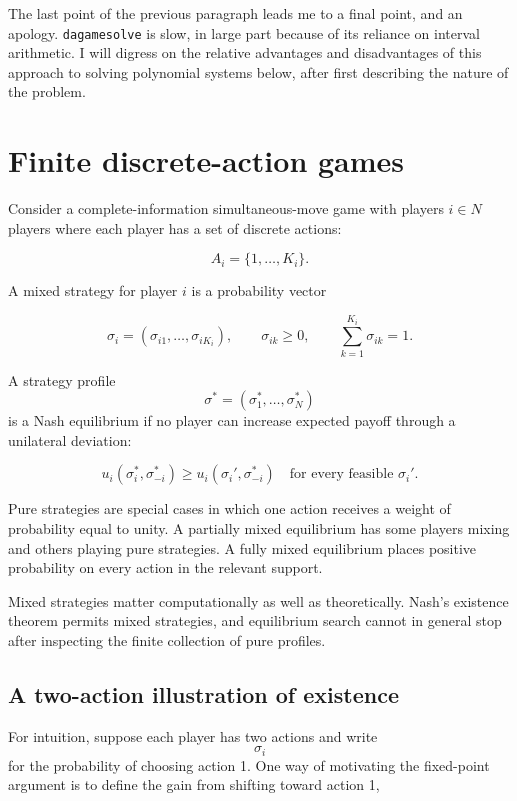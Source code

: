 \documentclass[11pt]{article}
\begin{document}
The last point of the previous paragraph leads me to a final point, and
an apology. \texttt{dagamesolve} is slow, in large part because of its
reliance on interval arithmetic. I will digress on the relative
advantages and disadvantages of this approach to solving polynomial
systems below, after first describing the nature of the problem.

    \section{Finite discrete-action
games}\label{finite-discrete-action-games}

Consider a complete-information simultaneous-move game with players
\(i \in N\) players where each player has a set of discrete actions:

\[
A_i=\{1,\ldots,K_i\}.
\]

A mixed strategy for player \(i\) is a probability vector

\[
\sigma_i=(\sigma_{i1},\ldots,\sigma_{iK_i}),
\qquad
\sigma_{ik}\geq 0,
\qquad
\sum_{k=1}^{K_i}\sigma_{ik}=1.
\]

A strategy profile \[\sigma^*=(\sigma_1^*,\ldots,\sigma_N^*)\] is a Nash
equilibrium if no player can increase expected payoff through a
unilateral deviation:

\[
u_i(\sigma_i^*,\sigma_{-i}^*)
\geq
u_i(\sigma_i',\sigma_{-i}^*)
\quad
\text{for every feasible }\sigma_i'.
\]

Pure strategies are special cases in which one action receives a weight
of probability equal to unity. A partially mixed equilibrium has some
players mixing and others playing pure strategies. A fully mixed
equilibrium places positive probability on every action in the relevant
support.

Mixed strategies matter computationally as well as theoretically. Nash's
existence theorem permits mixed strategies, and equilibrium search
cannot in general stop after inspecting the finite collection of pure
profiles.

    \subsection{A two-action illustration of
existence}\label{a-two-action-illustration-of-existence}

For intuition, suppose each player has two actions and write
\[\sigma_i\] for the probability of choosing action 1. One way of
motivating the fixed-point argument is to define the gain from shifting
toward action 1,
\end{document}
